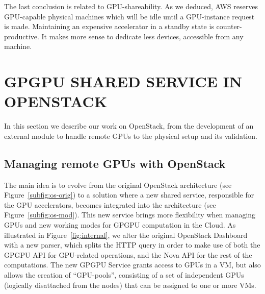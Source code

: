 \documentclass[a4paper,twoside]{article}
\begin{document}
The last conclusion is related to GPU-shareability. 
As we deduced, AWS reserves GPU-capable physical machines which will be idle until a GPU-instance request is made.
Maintaining an expensive accelerator in a standby state is counter-productive. 
It makes more sense to dedicate less devices, accessible from any machine.

\section{\uppercase{GPGPU Shared Service in OpenStack}}
\label{sec:gpgpuOS}
In this section we describe our work on OpenStack, from the development of an external module to handle remote GPUs to the physical setup and its validation.

\subsection{Managing remote GPUs with OpenStack}
The main idea is to evolve from the original OpenStack architecture (see Figure~\ref{subfig:os-orig})
 to a solution where a new shared service, responsible for the GPU accelerators, becomes integrated into the architecture (see Figure~\ref{subfig:os-mod}).
This new service brings more flexibility when managing GPUs and new working modes for GPGPU computation in the Cloud.
As illustrated in Figure~\ref{fig:internal}, we alter the original OpenStack Dashboard with a new parser, 
which splits the HTTP query in order to make use of both the GPGPU API for GPU-related operations, and the Nova API for the rest of the computations. 
The new GPGPU Service grants access to GPUs in a VM, but also allows the creation of ``GPU-pools'', consisting of a set of independent GPUs (logically disattached from the nodes) that can be assigned to one or more VMs.
\end{document}
